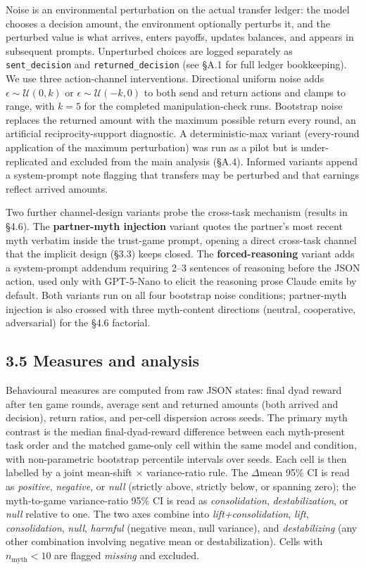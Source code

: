 \documentclass[
  10pt,
  letterpaper,
]{article}
\begin{document}
Noise is an environmental perturbation on the actual transfer ledger:
the model chooses a decision amount, the environment optionally perturbs
it, and the perturbed value is what arrives, enters payoffs, updates
balances, and appears in subsequent prompts. Unperturbed choices are
logged separately as \texttt{sent\_decision} and
\texttt{returned\_decision} (see §A.1 for full ledger bookkeeping). We
use three action-channel interventions. Directional uniform noise adds
\(\epsilon \sim \mathcal{U}(0,k)\) or
\(\epsilon \sim \mathcal{U}(-k,0)\) to both send and return actions and
clamps to range, with \(k=5\) for the completed manipulation-check runs.
Bootstrap noise replaces the returned amount with the maximum possible
return every round, an artificial reciprocity-support diagnostic. A
deterministic-max variant (every-round application of the maximum
perturbation) was run as a pilot but is under-replicated and excluded
from the main analysis (§A.4). Informed variants append a system-prompt
note flagging that transfers may be perturbed and that earnings reflect
arrived amounts.

Two further channel-design variants probe the cross-task mechanism
(results in §4.6). The \textbf{partner-myth injection} variant quotes
the partner's most recent myth verbatim inside the trust-game prompt,
opening a direct cross-task channel that the implicit design (§3.3)
keeps closed. The \textbf{forced-reasoning} variant adds a system-prompt
addendum requiring 2--3 sentences of reasoning before the JSON action,
used only with GPT-5-Nano to elicit the reasoning prose Claude emits by
default. Both variants run on all four bootstrap noise conditions;
partner-myth injection is also crossed with three myth-content
directions (neutral, cooperative, adversarial) for the §4.6 factorial.

\subsection{3.5 Measures and analysis}\label{measures-and-analysis}

Behavioural measures are computed from raw JSON states: final dyad
reward after ten game rounds, average sent and returned amounts (both
arrived and decision), return ratios, and per-cell dispersion across
seeds. The primary myth contrast is the median final-dyad-reward
difference between each myth-present task order and the matched
game-only cell within the same model and condition, with non-parametric
bootstrap percentile intervals over seeds. Each cell is then labelled by
a joint mean-shift × variance-ratio rule. The \(\Delta\)mean 95\% CI is
read as \emph{positive}, \emph{negative}, or \emph{null} (strictly
above, strictly below, or spanning zero); the myth-to-game
variance-ratio 95\% CI is read as \emph{consolidation},
\emph{destabilization}, or \emph{null} relative to one. The two axes
combine into \emph{lift+consolidation}, \emph{lift},
\emph{consolidation}, \emph{null}, \emph{harmful} (negative mean, null
variance), and \emph{destabilizing} (any other combination involving
negative mean or destabilization). Cells with \(n_{\text{myth}} < 10\)
are flagged \emph{missing} and excluded.
\end{document}
